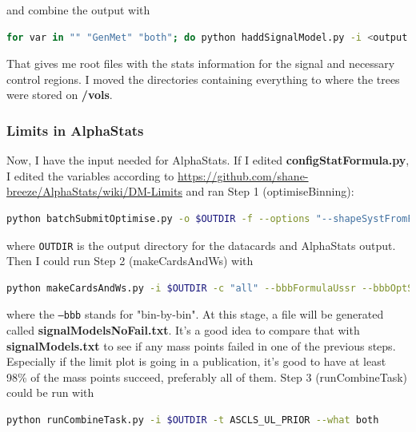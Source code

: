and combine the output with

\begin{lstlisting}[belowskip=-0.7cm, language=sh, numbers=none]
for var in "" "GenMet" "both"; do python haddSignalModel.py -i <output dir from previous step>/T2ttOutput${var} -f; done
\end{lstlisting}

That gives me root files with the stats information for the signal and necessary control regions. I moved the directories containing everything to where the trees were stored on \textbf{/vols}.


\subsubsection{Limits in AlphaStats}

Now, I have the input needed for AlphaStats. If I edited \textbf{configStatFormula.py}, I edited the variables according to \url{https://github.com/shane-breeze/AlphaStats/wiki/DM-Limits} and ran Step 1 (optimiseBinning):

\begin{lstlisting}[belowskip=-0.7cm, language=sh, numbers=none]
python batchSubmitOptimise.py -o $OUTDIR -f --options "--shapeSystFromFile --getDataLumi --runFormula  --extrapolateZinv --greenBand" --submit
\end{lstlisting}

where \texttt{OUTDIR} is the output directory for the datacards and AlphaStats output. Then I could run Step 2 (makeCardsAndWs) with

\begin{lstlisting}[belowskip=-0.7cm, language=sh, numbers=none]
python makeCardsAndWs.py -i $OUTDIR -c "all" --bbbFormulaUssr --bbbOptSig
\end{lstlisting}

where the \texttt{--bbb} stands for "bin-by-bin". At this stage, a file will be generated called \textbf{signalModelsNoFail.txt}. It's a good idea to compare that with \textbf{signalModels.txt} to see if any mass points failed in one of the previous steps. Especially if the limit plot is going in a publication, it's good to have at least 98\% of the mass points succeed, preferably all of them. Step 3 (runCombineTask) could be run with

\begin{lstlisting}[belowskip=-0.7cm, language=sh, numbers=none]
python runCombineTask.py -i $OUTDIR -t ASCLS_UL_PRIOR --what both
\end{lstlisting}

